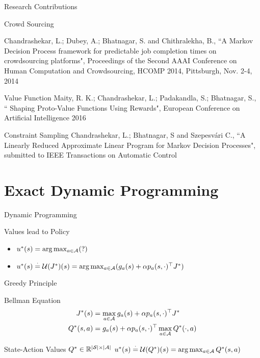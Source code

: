 \documentclass[10pt,handout]{beamer}
\begin{document}
\begin{frame}[fragile]{Research Contributions}
\begin{block}{Crowd Sourcing}

Chandrashekar, L.;  Dubey, A.; Bhatnagar, S. and Chithralekha, B., ``A Markov Decision Process framework for predictable job completion times on crowdsourcing platforms", Proceedings of the Second {AAAI} Conference on Human Computation and Crowdsourcing, {HCOMP} 2014, Pittsburgh, Nov. 2-4, 2014
\end{block}
\begin{block}{Value Function}
Maity, R. K.; Chandrashekar, L.;  Padakandla, S.; Bhatnagar, S., `` Shaping Proto-Value Functions Using Rewards", European Conference on Artificial Intelligence 2016\\
\end{block}
\begin{block}{Constraint Sampling}
Chandrashekar, L.;  Bhatnagar, S and Szepesv\'{a}ri C., ``A Linearly Reduced Approximate Linear Program for Markov Decision Processes", submitted to IEEE Transactions on Automatic Control
\end{block}

\end{frame}



\section{Exact Dynamic Programming}

\begin{frame}[fragile]{Dynamic Programming}
\begin{block}{Values lead to Policy}
\begin{itemize}
\item$u^*(s)=\arg\max_{a\in \mathcal{A}}(?)$
\item $u^*(s)\stackrel{\cdot}{=} \mathcal{U}(J^*)(s) =\arg\max_{a\in \mathcal{A}} (g_a(s)+\alpha p_a(s,\cdot)^\top J^*)$
\end{itemize}
\end{block}
\begin{block}{Greedy Principle}
{\color{orange}{Best = Current Best+ Future Best}}
\end{block}
\begin{block}{Bellman Equation}
\begin{align*}
J^*(s)&=\max_{a\in \mathcal{A}} g_a(s)+\alpha p_a(s,\cdot)^\top J^*\\
Q^*(s,a)&= g_a(s)+\alpha p_a(s,\cdot)^\top \max_{a\in \mathcal{A}} Q^*(\cdot,a)
\end{align*}
\end{block}
\begin{block}{State-Action Values $Q^*\in \mathbb{R}^{|\mathcal{S}|\times |\mathcal{A}|}$}
$u^*(s)\stackrel{\cdot}{=} \mathcal{U}(Q^*)(s) =\arg\max_{a\in \mathcal{A}} Q^*(s,a)$
\end{block}


\end{frame}
\end{document}
